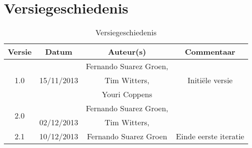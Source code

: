 \chapter{Versiegeschiedenis}

\begin{table}[htbp]
	\centering
	\begin{tabular} {|c|c|c|c|}
	    \hline
				\textbf{Versie} & \textbf{Datum} & \textbf{Auteur(s)} & \textbf{Commentaar} \\
		\hline
		\multirow{3}{*}{1.0 }   &  & Fernando Suarez Groen, &  \\
		                        & 15/11/2013  & Tim Witters,  & Initi\"{e}le versie\\
		                        &   & Youri Coppens & \\ 
		\hline
		\multirow{2}{*}{2.0 }   &  & Fernando Suarez Groen, &  \\
		                        & 02/12/2013  & Tim Witters, & \\ 
		\hline
		\multirow{1}{*}{2.1 }   & 10/12/2013  & Fernando Suarez Groen  & Einde eerste iteratie\\ \hline
		                        
	\end{tabular}
	\caption{Versiegeschiedenis}
\end{table}